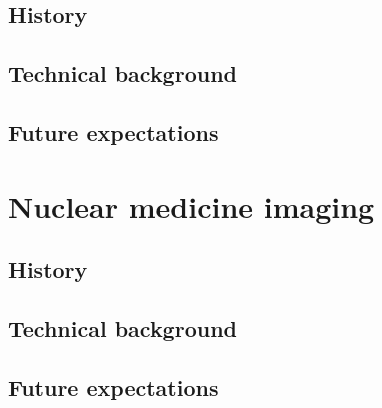 \subsection{History}

\subsection{Technical background}

\subsection{Future expectations}

\section{Nuclear medicine imaging}

\subsection{History}

\subsection{Technical background}

\subsection{Future expectations}


